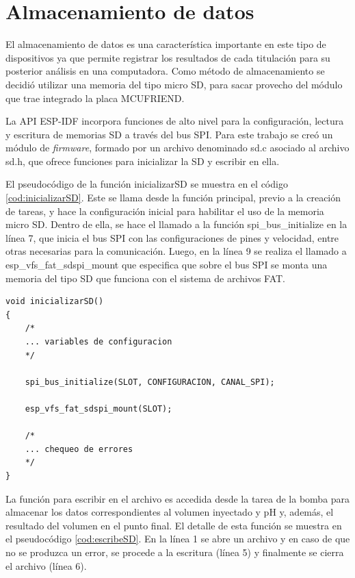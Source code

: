 \section{Almacenamiento de datos}

El almacenamiento de datos es una característica importante en este tipo de dispositivos ya que permite registrar los resultados de cada titulación para su posterior análisis en una computadora. Como método de almacenamiento se decidió utilizar una memoria del tipo micro SD, para sacar provecho del módulo que trae integrado la placa MCUFRIEND.

La API ESP-IDF incorpora funciones de alto nivel para la configuración, lectura y escritura de memorias SD a través del bus SPI. Para este trabajo se creó un módulo de \textit{firmware}, formado por un archivo denominado sd.c asociado al archivo sd.h, que ofrece funciones para inicializar la SD y escribir en ella.

El pseudocódigo de la función inicializarSD se muestra en el código \ref{cod:inicializarSD}. Este se llama desde la función principal, previo a la creación de tareas, y hace la configuración inicial para habilitar el uso de la memoria micro SD. Dentro de ella, se hace el llamado a  la función spi\_bus\_initialize en la línea 7, que inicia el bus SPI con las configuraciones de pines y velocidad, entre otras necesarias para la comunicación. Luego, en la línea 9 se realiza el llamado a esp\_vfs\_fat\_sdspi\_mount que especifica que sobre el bus SPI se monta una memoria del tipo SD que funciona con el sistema de archivos FAT.

\vspace{3 cm}

\begin{lstlisting}[label=cod:inicializarSD,caption=Pseudocódigo de la función que configura e inicia memoria SD.]
void inicializarSD()
{
	/*
	... variables de configuracion
	*/
	
	spi_bus_initialize(SLOT, CONFIGURACION, CANAL_SPI);

    esp_vfs_fat_sdspi_mount(SLOT);
    
	/*
	... chequeo de errores
	*/
}
\end{lstlisting}

La función para escribir en el archivo es accedida desde la tarea de la bomba para almacenar los datos correspondientes al volumen inyectado y pH y, además, el resultado del volumen en el punto final. El detalle de esta función se muestra en el pseudocódigo \ref{cod:escribeSD}. En la línea 1 se abre un archivo y en caso de que no se produzca un error, se procede a la escritura (línea 5) y finalmente se cierra el archivo (línea 6).

